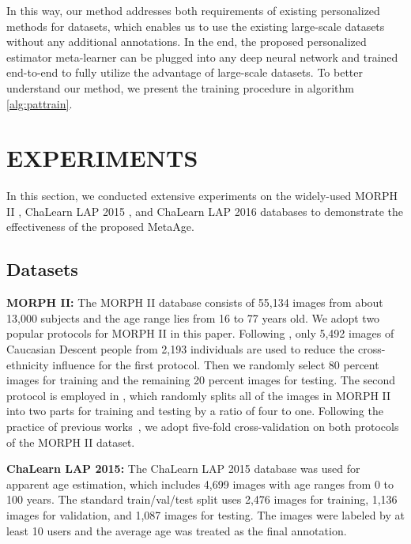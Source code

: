 \documentclass[journal,twoside]{IEEEtran}
\begin{document}
In this way, our method addresses both requirements of existing personalized methods for datasets, which enables us to use the existing large-scale datasets  without any additional annotations. In the end, the proposed personalized estimator meta-learner can be plugged into any deep neural network and trained end-to-end to fully utilize the advantage of large-scale datasets. To better understand our method, we present the training procedure in algorithm \ref{alg:pattrain}.





\section{EXPERIMENTS}
In this section, we conducted extensive experiments on the widely-used MORPH II \cite{ricanek2006morph},  ChaLearn LAP 2015 \cite{escalera2015chalearn}, and ChaLearn LAP 2016 \cite{escalera2016chalearn} databases to demonstrate the effectiveness of the proposed MetaAge.

\subsection{Datasets}


\textbf{MORPH II:} The MORPH II database \cite{ricanek2006morph} consists of 55,134 images from about 13,000 subjects and the age range lies from 16 to 77 years old. We adopt two popular protocols for MORPH II in this paper. Following \cite{chang2011ordinal,agustsson2017anchored,rothe2018deep}, only 5,492 images of Caucasian Descent people from 2,193 individuals are used to reduce the cross-ethnicity influence for the first protocol. Then we randomly select 80 percent images for training and the remaining 20 percent images for testing. The second protocol is employed in \cite{shen2017label,chen2017using}, which randomly splits all of the images in MORPH II into two parts for training and testing by a ratio of four to one.
Following the practice of previous works~\cite{pan2020self,shen2018deep}, we adopt five-fold cross-validation on both protocols of the MORPH II dataset. 


\textbf{ChaLearn LAP 2015:} The ChaLearn LAP 2015 database \cite{escalera2015chalearn} was used for apparent age estimation, which includes 4,699 images with age ranges from 0 to 100 years.  The standard train/val/test split uses 2,476 images for training, 1,136 images for validation, and 1,087 images for testing. The images were labeled by at least 10 users and the average age was treated as the final annotation.
\end{document}
